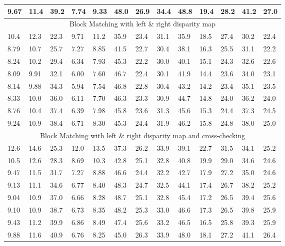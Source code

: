\begin{tabular}{|l|l|l||l|l|l||l|l|l||l|l|l||l|}
  9.67 & 11.4 & 39.2 & 7.74 & 9.33 & 48.0 & 26.9 & 34.4 & 48.8 & 19.4 & 28.2 & 41.2 & 27.0 \\
  \hline
  \multicolumn{13}{|c|}{Block Matching with left \& right disparity map} \\
  \hline
  10.4 & 12.3 & 22.3 & 9.71 & 11.2 & 35.9 & 23.4 & 31.1 & 35.9 & 18.5 & 27.4 & 30.2 & 22.4 \\
  8.79 & 10.7 & 25.7 & 7.27 & 8.85 & 41.5 & 22.7 & 30.4 & 38.1 & 16.3 & 25.5 & 31.1 & 22.2 \\
  8.24 & 10.2 & 29.4 & 6.34 & 7.93 & 45.3 & 22.2 & 30.0 & 40.1 & 15.1 & 24.3 & 32.6 & 22.6 \\
  8.09 & 9.91 & 32.1 & 6.00 & 7.60 & 46.7 & 22.4 & 30.1 & 41.9 & 14.4 & 23.6 & 34.0 & 23.1 \\
  8.14 & 9.88 & 34.3 & 5.94 & 7.54 & 46.8 & 22.8 & 30.4 & 43.2 & 14.2 & 23.4 & 35.1 & 23.5 \\
  8.33 & 10.0 & 36.0 & 6.11 & 7.70 & 46.3 & 23.3 & 30.9 & 44.7 & 14.8 & 24.0 & 36.2 & 24.0 \\
  8.76 & 10.4 & 37.4 & 6.39 & 7.98 & 45.8 & 23.6 & 31.3 & 45.6 & 15.3 & 24.4 & 37.3 & 24.5 \\
  9.24 & 10.9 & 38.4 & 6.71 & 8.30 & 45.3 & 24.4 & 31.9 & 46.2 & 15.8 & 24.8 & 38.0 & 25.0 \\
  \hline
  \multicolumn{13}{|c|}{Block Matching with left \& right disparity map and cross-checking} \\
  \hline
  12.6 & 14.6 & 25.3 & 12.0 & 13.5 & 37.3 & 26.2 & 33.9 & 39.1 & 22.7 & 31.5 & 34.1 & 25.2 \\
  10.5 & 12.6 & 28.3 & 8.69 & 10.3 & 42.8 & 25.1 & 32.8 & 40.8 & 19.9 & 29.0 & 34.6 & 24.6 \\
  9.47 & 11.5 & 31.7 & 7.27 & 8.88 & 46.6 & 24.4 & 32.2 & 42.7 & 17.9 & 27.2 & 35.0 & 24.6 \\
  9.13 & 11.1 & 34.6 & 6.77 & 8.40 & 48.3 & 24.7 & 32.5 & 44.1 & 17.4 & 26.7 & 38.2 & 25.2 \\
  9.04 & 10.9 & 37.0 & 6.66 & 8.28 & 48.7 & 25.1 & 32.8 & 45.4 & 17.2 & 26.5 & 39.4 & 25.6 \\
  9.10 & 10.9 & 38.7 & 6.73 & 8.35 & 48.2 & 25.3 & 33.0 & 46.6 & 17.3 & 26.5 & 39.8 & 25.9 \\
  9.43 & 11.2 & 39.9 & 6.86 & 8.49 & 47.4 & 25.6 & 33.2 & 46.5 & 16.5 & 25.8 & 39.3 & 25.9 \\
  9.88 & 11.6 & 40.9 & 6.76 & 8.25 & 45.0 & 26.3 & 33.9 & 48.0 & 18.1 & 27.2 & 41.1 & 26.4 \\

  \hline
\end{tabular}


